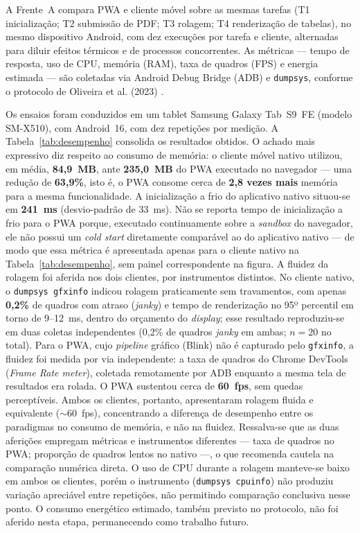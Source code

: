 A Frente~A compara PWA e cliente móvel sobre as mesmas tarefas (T1 inicialização;
T2 submissão de PDF; T3 rolagem; T4 renderização de tabelas), no mesmo
dispositivo Android, com dez execuções por tarefa e cliente, alternadas para
diluir efeitos térmicos e de processos concorrentes. As métricas --- tempo de
resposta, uso de CPU, memória (RAM), taxa de quadros (FPS) e energia estimada ---
são coletadas via Android Debug Bridge (ADB) e \texttt{dumpsys}, conforme o
protocolo de Oliveira et al. (2023) \cite{oliveira2023}.

Os ensaios foram conduzidos em um tablet Samsung Galaxy Tab~S9~FE
(modelo SM-X510), com Android~16, com dez repetições por medição.
A Tabela~\ref{tab:desempenho} consolida os resultados obtidos. O achado mais
expressivo diz respeito ao consumo de memória: o cliente móvel nativo utilizou,
em média, \textbf{84,9~MB}, ante \textbf{235,0~MB} do PWA executado no
navegador --- uma redução de \textbf{63,9\%}, isto é, o PWA consome cerca de
\textbf{2,8 vezes mais} memória para a mesma funcionalidade. A inicialização a
frio do aplicativo nativo situou-se em \textbf{241~ms} (desvio-padrão de
33~ms). Não se reporta tempo de inicialização a frio para o PWA porque, executado
continuamente sobre a \emph{sandbox} do navegador, ele não possui um \emph{cold
start} diretamente comparável ao do aplicativo nativo --- de modo que essa métrica
é apresentada apenas para o cliente nativo na Tabela~\ref{tab:desempenho}, sem painel
correspondente na figura. A fluidez da rolagem foi aferida nos dois clientes, por
instrumentos distintos. No cliente nativo, o \texttt{dumpsys gfxinfo} indicou rolagem
praticamente sem travamentos, com apenas \textbf{0,2\%} de quadros com atraso
(\emph{janky}) e tempo de renderização no 95º percentil em torno de 9--12~ms, dentro
do orçamento do \emph{display}; esse resultado reproduziu-se em duas coletas
independentes (0,2\% de quadros \emph{janky} em ambas; $n=20$ no total). Para o PWA,
cujo \emph{pipeline} gráfico (Blink) não é capturado pelo \texttt{gfxinfo}, a fluidez
foi medida por via independente: a taxa de quadros do Chrome DevTools (\emph{Frame
Rate meter}), coletada remotamente por ADB enquanto a mesma tela de resultados era
rolada. O PWA sustentou cerca de \textbf{60~fps}, sem quedas perceptíveis. Ambos os
clientes, portanto, apresentaram rolagem fluida e equivalente ($\sim$60~fps),
concentrando a diferença de desempenho entre os paradigmas no consumo de memória, e
não na fluidez. Ressalva-se que as duas aferições empregam métricas e instrumentos
diferentes --- taxa de quadros no PWA; proporção de quadros lentos no nativo ---, o
que recomenda cautela na comparação numérica direta. O uso de CPU durante a
rolagem manteve-se baixo em ambos os clientes, porém o instrumento
(\texttt{dumpsys cpuinfo}) não produziu variação apreciável entre repetições, não
permitindo comparação conclusiva nesse ponto. O consumo energético estimado,
também previsto no protocolo, não foi aferido nesta etapa, permanecendo como
trabalho futuro.

